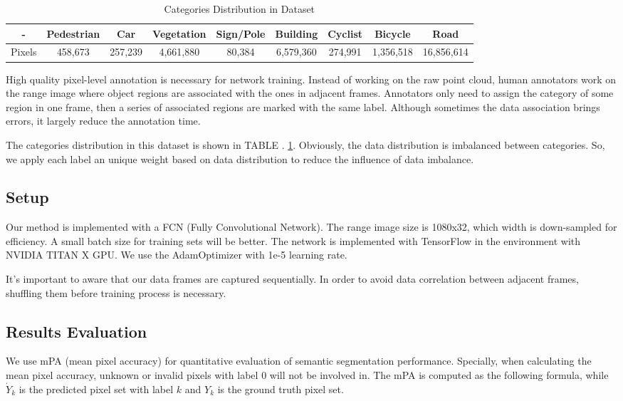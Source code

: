 	\begin{table}
		\caption{Categories Distribution in Dataset}
		\label{category_distribution}
		\centering
		\small
		\renewcommand{\arraystretch}{1.5}
		\begin{tabular}{|c|c|c|c|c|c|c|c|c|}
			\hline
			- & Pedestrian & Car & Vegetation & Sign/Pole & Building & Cyclist & Bicycle & Road	\\
			\hline
			Pixels & 458,673 & 257,239 & 4,661,880 & 80,384 & 6,579,360 & 274,991 & 1,356,518 & 16,856,614	\\
			\hline
		\end{tabular}
	\end{table}
	
	High quality pixel-level annotation is necessary for network training. Instead of working on the raw point cloud, human annotators work on the range image where object regions are associated with the ones in adjacent frames. Annotators only need to assign the category of some region in one frame, then a series of associated regions are marked with the same label. Although sometimes the data association brings errors, it largely reduce the annotation time. 
	
	The categories distribution in this dataset is shown in TABLE . \ref{category_distribution}. Obviously, the data distribution is imbalanced between categories. So, we apply each label an unique weight based on data distribution to reduce the influence of data imbalance.
	
	\subsection{Setup}
	Our method is implemented with a FCN (Fully Convolutional Network). The range image size is 1080x32, which width is down-sampled for efficiency. A small batch size for training sets will be better. The network is implemented with TensorFlow in the environment with NVIDIA TITAN X GPU. We use the AdamOptimizer with 1e-5 learning rate.
	
	It's important to aware that our data frames are captured sequentially. In order to avoid data correlation between adjacent frames, shuffling them before training process is necessary.
	
	\subsection{Results Evaluation}
	We use mPA (mean pixel accuracy) for quantitative evaluation of semantic segmentation performance. Specially, when calculating the mean pixel accuracy, unknown or invalid pixels with label 0 will not be involved in. The mPA is computed as the following formula, while $\dot{Y}_k$ is the predicted pixel set with label $k$ and $Y_k$ is the ground truth pixel set.
	
